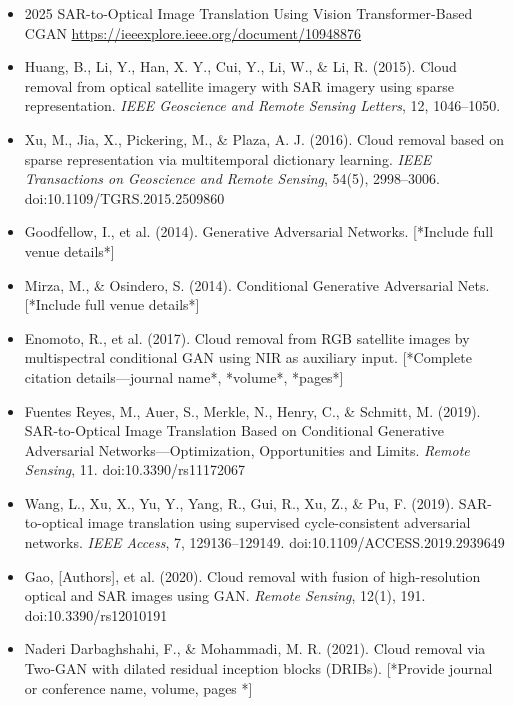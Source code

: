 \begin{itemize}
    
    \item 2025 SAR-to-Optical Image Translation Using Vision Transformer-Based CGAN
    \url{https://ieeexplore.ieee.org/document/10948876}
    

    \item Huang, B., Li, Y., Han, X. Y., Cui, Y., Li, W., & Li, R. (2015). Cloud removal from optical satellite imagery with SAR imagery using sparse representation. \textit{IEEE Geoscience and Remote Sensing Letters}, 12, 1046–1050.

    \item Xu, M., Jia, X., Pickering, M., & Plaza, A. J. (2016). Cloud removal based on sparse representation via multitemporal dictionary learning. \textit{IEEE Transactions on Geoscience and Remote Sensing}, 54(5), 2998–3006. doi:10.1109/TGRS.2015.2509860

    \item Goodfellow, I., et al. (2014). Generative Adversarial Networks. [*Include full venue details*]

    \item Mirza, M., & Osindero, S. (2014). Conditional Generative Adversarial Nets. [*Include full venue details*]

    \item Enomoto, R., et al. (2017). Cloud removal from RGB satellite images by multispectral conditional GAN using NIR as auxiliary input. [*Complete citation details—journal name*, *volume*, *pages*]

    \item Fuentes Reyes, M., Auer, S., Merkle, N., Henry, C., & Schmitt, M. (2019). SAR-to-Optical Image Translation Based on Conditional Generative Adversarial Networks—Optimization, Opportunities and Limits. \textit{Remote Sensing}, 11. doi:10.3390/rs11172067

    \item Wang, L., Xu, X., Yu, Y., Yang, R., Gui, R., Xu, Z., & Pu, F. (2019). SAR-to-optical image translation using supervised cycle-consistent adversarial networks. \textit{IEEE Access}, 7, 129136–129149. doi:10.1109/ACCESS.2019.2939649

    \item Gao, [Authors], et al. (2020). Cloud removal with fusion of high-resolution optical and SAR images using GAN. \textit{Remote Sensing}, 12(1), 191. doi:10.3390/rs12010191

    \item Naderi Darbaghshahi, F., & Mohammadi, M. R. (2021). Cloud removal via Two-GAN with dilated residual inception blocks (DRIBs). [*Provide journal or conference name, volume, pages *]

    
\end{itemize}
